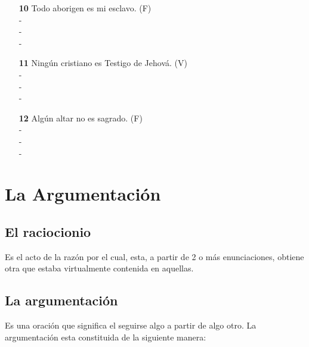 \documentclass{article}
\begin{document}
\begin{itemize}
        -\\
        -\\
        -\\
        \item[\textbf{10}] Todo aborigen es mi esclavo. (F) \\
        -\\
        -\\
        -\\
        \item[\textbf{11}] Ningún cristiano es Testigo de Jehová. (V) \\
        -\\
        -\\
        -\\
        \item[\textbf{12}] Algún altar no es sagrado. (F) \\
        -\\
        -\\
        -\\
    \end{itemize}
    
\newpage

\section{La Argumentación}

\subsection{El raciocionio}
Es el acto de la razón por el cual, esta, a partir de 2 o más enunciaciones, obtiene otra que estaba virtualmente contenida en aquellas.

\subsection{La argumentación}
Es una oración que significa el seguirse algo a partir de algo otro.
La argumentación esta constituida de la siguiente manera:
\end{document}
